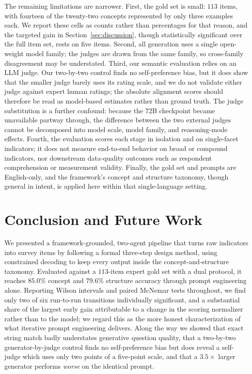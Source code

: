 \documentclass[onecolumn, 11pt]{IEEEtran}
\begin{document}
The remaining limitations are narrower. First, the gold set is small: $113$ items, with fourteen of the twenty-two concepts represented by only three examples each. We report these cells as counts rather than percentages for that reason, and the targeted gain in Section~\ref{sec:discussion}, though statistically significant over the full item set, rests on five items. Second, all generation uses a single open-weight model family; the judges are drawn from the same family, so cross-family disagreement may be understated. Third, our semantic evaluation relies on an LLM judge. Our two-by-two control finds no self-preference bias, but it does show that the smaller judge barely uses its rating scale, and we do not validate either judge against expert human ratings; the absolute alignment scores should therefore be read as model-based estimates rather than ground truth. The judge substitution is a further confound: because the 72B checkpoint became unavailable partway through, the difference between the two external judges cannot be decomposed into model scale, model family, and reasoning-mode effects. Fourth, the evaluation scores each stage in isolation and on single-facet indicators; it does not measure end-to-end behavior on broad or compound indicators, nor downstream data-quality outcomes such as respondent comprehension or measurement validity. Finally, the gold set and prompts are English-only, and the framework's concept and structure taxonomy, though general in intent, is applied here within that single-language setting.

\section{Conclusion and Future Work}
\label{sec:conclusion}

We presented a framework-grounded, two-agent pipeline that turns raw indicators into survey items by following a formal three-step design method, using constrained decoding to keep every output inside the concept-and-structure taxonomy. Evaluated against a $113$-item expert gold set with a dual protocol, it reaches $85.0\%$ concept and $79.6\%$ structure accuracy through prompt engineering alone. Reporting Wilson intervals and paired McNemar tests throughout, we find only two of six run-to-run transitions individually significant, and a substantial share of the largest early gain attributable to a change in the scoring normalizer rather than to the model; we regard this as the more honest characterization of what iterative prompt engineering delivers. Along the way we showed that exact string match badly understates generative question quality, that a two-by-two generator-by-judge control finds no self-preference bias but does reveal a self-judge which uses only two points of a five-point scale, and that a $3.5\times$ larger generator performs \emph{worse} on the identical prompt.
\end{document}
